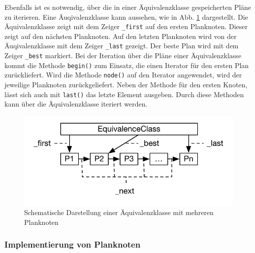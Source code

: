 Ebenfalls ist es notwendig, über die in einer Äquivalenzklasse gespeicherten Pläne zu iterieren. Eine Äuqivalenzklasse kann aussehen,  wie in Abb. \ref{EquivalenceClassList} dargestellt. Die Äquivalenzklasse zeigt mit dem Zeiger \texttt{\_first} auf den ersten Planknoten. Dieser zeigt auf den nächsten Planknoten. Auf den letzten Planknoten wird von der Äuqivalenzklasse mit dem Zeiger \texttt{\_last} gezeigt. Der beste Plan wird mit dem Zeiger \texttt{\_best} markiert. Bei der Iteration über die Pläne einer Äquivalenzklasse kommt die Methode \texttt{begin()} zum Einsatz, die einen Iterator für den ersten Plan zurückliefert. Wird die Methode \texttt{node()} auf den Iterator angewendet, wird der jeweilige Planknoten zurückgeliefert. Neben der Methode für den ersten Knoten, lässt sich auch mit \texttt{last()} das letzte Element ausgeben. Durch diese Methoden kann über die Äquivalenzklasse iteriert werden.

\begin{figure}[ht]
  \centering
  \includegraphics[scale=0.75]{04_Implementierung/00_media/EquivalenceClassList.pdf}
  \caption{Schematische Darstellung einer Äquivalenzklasse mit mehreren Planknoten}
  \label{EquivalenceClassList}
\end{figure}


\subsubsection{Implementierung von Planknoten}

